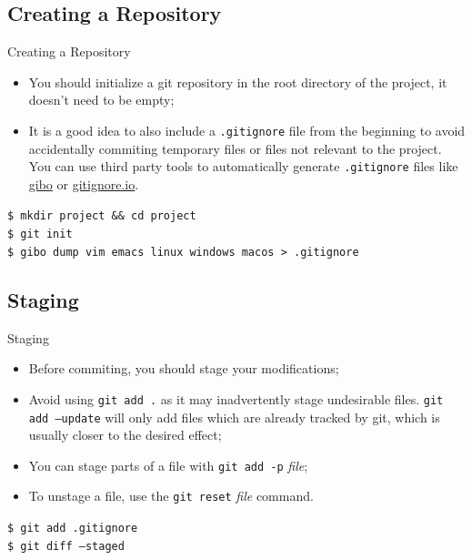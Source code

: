 \documentclass{beamer}
\begin{document}
\subsection{Creating a Repository}
\begin{frame}{Creating a Repository}
  \begin{itemize}
    \item You should initialize a git repository in the root directory of the project, it doesn't need to be empty;
    \item It is a good idea to also include a \texttt{.gitignore} file from the beginning to avoid accidentally commiting temporary files or files not relevant to the project. You can use third party tools to automatically generate \texttt{.gitignore} files like \href{https://github.com/simonwhitaker/gibo}{gibo} or \href{https://www.toptal.com/developers/gitignore/}{gitignore.io}.
  \end{itemize}
  \begin{block}{}
    \texttt{\$ mkdir project \&\& cd project} \\
    \texttt{\$ git init} \\
    \texttt{\$ gibo dump vim emacs linux windows macos > .gitignore}
  \end{block}
\end{frame}

\subsection{Staging}
\begin{frame}{Staging}
  \begin{itemize}
    \item Before commiting, you should stage your modifications;
    \item Avoid using \texttt{git add .} as it may inadvertently stage undesirable files. \texttt{git add --update} will only add files which are already tracked by git, which is usually closer to the desired effect;
    \item You can stage parts of a file with \texttt{git add -p} \textit{file};
    \item To unstage a file, use the \texttt{git reset} \textit{file} command.
  \end{itemize}
  \begin{block}{}
    \texttt{\$ git add .gitignore} \\
    \texttt{\$ git diff --staged}
  \end{block}
\end{frame}
\end{document}
